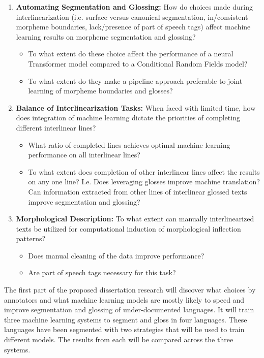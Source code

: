 \begin{enumerate}
\item{} \textbf{Automating Segmentation and Glossing:} How do choices made during interlinearization (i.e. surface versus canonical segmentation, in/consistent morpheme boundaries, lack/presence of part of speech tags) affect machine learning results on morpheme segmentation and glossing? 
     \begin{itemize}
        \item To what extent do these choice affect the performance of a neural Transformer model compared to a Conditional Random Fields model? 
        \item To what extent do they make a pipeline approach preferable to joint learning of morpheme boundaries and glosses?
    \end{itemize}
\item{} \textbf{Balance of Interlinearization Tasks:} When faced with limited time, how does integration of machine learning dictate the priorities of completing different interlinear lines? 
    \begin{itemize}
        \item{} What ratio of completed lines achieves optimal machine learning performance on all interlinear lines?
        \item{} To what extent does completion of other interlinear lines affect the results on any one line? I.e.  Does leveraging glosses improve machine translation? Can information extracted from other lines of interlinear glossed texts improve segmentation and glossing?  
    \end{itemize}
\item{} \textbf{Morphological Description:} To what extent can manually interlinearized texts be utilized for computational induction of morphological inflection patterns? 
    \begin{itemize}
    \item{} Does manual cleaning of the data improve performance?
    \item{} Are part of speech tags necessary for this task?
    \end{itemize}
\end{enumerate}

The first part of the proposed dissertation research will discover what choices by annotators and what machine learning models are mostly likely to speed and improve segmentation and glossing of under-documented languages. It will train three machine learning systems to segment and gloss in four languages. These languages have been segmented with two strategies that will be used to train different models. The results from each will be compared across the three systems.  

